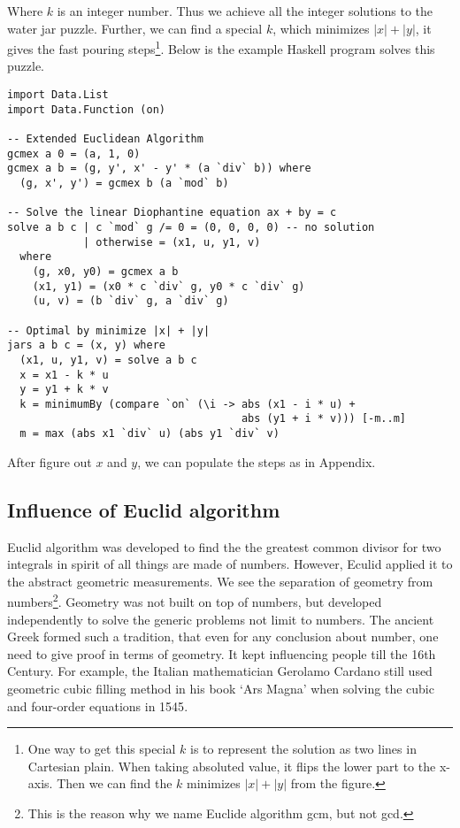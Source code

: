\documentclass{article}
\begin{document}
Where $k$ is an integer number. Thus we achieve all the integer solutions to the water jar puzzle. Further, we can find a special $k$, which minimizes $|x| + |y|$, it gives the fast pouring steps\footnote{One way to get this special $k$ is to represent the solution as two lines in Cartesian plain. When taking absoluted value, it flips the lower part to the x-axis. Then we can find the $k$ minimizes $|x| + |y|$ from the figure.}. Below is the example Haskell program solves this  puzzle.

\lstset{frame=single}
\begin{lstlisting}
import Data.List
import Data.Function (on)

-- Extended Euclidean Algorithm
gcmex a 0 = (a, 1, 0)
gcmex a b = (g, y', x' - y' * (a `div` b)) where
  (g, x', y') = gcmex b (a `mod` b)

-- Solve the linear Diophantine equation ax + by = c
solve a b c | c `mod` g /= 0 = (0, 0, 0, 0) -- no solution
            | otherwise = (x1, u, y1, v)
  where
    (g, x0, y0) = gcmex a b
    (x1, y1) = (x0 * c `div` g, y0 * c `div` g)
    (u, v) = (b `div` g, a `div` g)

-- Optimal by minimize |x| + |y|
jars a b c = (x, y) where
  (x1, u, y1, v) = solve a b c
  x = x1 - k * u
  y = y1 + k * v
  k = minimumBy (compare `on` (\i -> abs (x1 - i * u) +
                                     abs (y1 + i * v))) [-m..m]
  m = max (abs x1 `div` u) (abs y1 `div` v)
\end{lstlisting}

After figure out $x$ and $y$, we can populate the steps as in Appendix.

\subsection{Influence of Euclid algorithm}

Euclid algorithm was developed to find the the greatest common divisor for two integrals in spirit of all things are made of numbers. However, Eculid applied it to the abstract geometric measurements. We see the separation of geometry from numbers\footnote{This is the reason why we name Euclide algorithm gcm, but not gcd.}. Geometry was not built on top of numbers, but developed independently to solve the generic problems not limit to numbers. The ancient Greek formed such a tradition, that even for any conclusion about number, one need to give proof in terms of geometry. It kept influencing people till the 16th Century. For example, the Italian mathematician Gerolamo Cardano still used geometric cubic filling method in his book `Ars Magna' when solving the cubic and four-order equations in 1545\cite{HanXueTao2009}.
\end{document}
